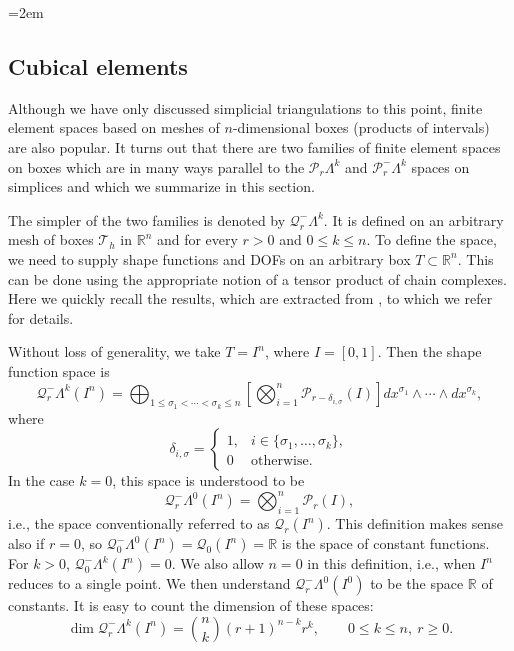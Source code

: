 \begingroup\emergencystretch=2em
\subsection{{Cubical elements}}\label{sec:cubical-elements}

{Although we have only discussed simplicial triangulations to this point, finite element spaces based on meshes of $n$-dimensional boxes (products of intervals) are also popular. It turns out that there are two families of finite element spaces on boxes which are in many ways parallel to the $\mathcal P_r\Lambda^k$ and $\mathcal P_r^-\Lambda^k$ spaces on simplices and which we summarize in this section.}

{The simpler of the two families is denoted by $\mathcal Q_r^-\Lambda^k$. It is defined on an arbitrary mesh of boxes $\mathcal T_h$ in $\mathbb R^n$ and for every $r>0$ and $0\leq k\leq n$. To define the space, we need to supply shape functions and DOFs on an arbitrary box $T\subset\mathbb R^n$. This can be done using the appropriate notion of a tensor product of chain complexes. Here we quickly recall the results, which are extracted from , to which we refer for details.}

{Without loss of generality, we take $T=I^n$, where $I=[0,1]$. Then the shape function space is}
\[
\mathcal Q_r^-\Lambda^k(I^n)=\bigoplus_{1\leq\sigma_1<\cdots<\sigma_k\leq n}\left[\bigotimes_{i=1}^n\mathcal P_{r-\delta_{i,\sigma}}(I)\right]dx^{\sigma_1}\wedge\cdots\wedge dx^{\sigma_k},
\]
{where}
\[
\delta_{i,\sigma}=\begin{cases}1,&i\in\{\sigma_1,\ldots,\sigma_k\},\\0&\text{otherwise}.\end{cases}
\]
{In the case $k=0$, this space is understood to be}
\[
\mathcal Q_r^-\Lambda^0(I^n)=\bigotimes_{i=1}^n\mathcal P_r(I),
\]
{i.e., the space conventionally referred to as $\mathcal Q_r(I^n)$. This definition makes sense also if $r=0$, so $\mathcal Q_0^-\Lambda^0(I^n)=\mathcal Q_0(I^n)=\mathbb R$ is the space of constant functions. For $k>0$, $\mathcal Q_0^-\Lambda^k(I^n)=0$. We also allow $n=0$ in this definition, i.e., when $I^n$ reduces to a single point. We then understand $\mathcal Q_r^-\Lambda^0(I^0)$ to be the space $\mathbb R$ of constants. It is easy to count the dimension of these spaces:}
\[
\dim\mathcal Q_r^-\Lambda^k(I^n)=\binom nk(r+1)^{n-k}r^k,\qquad0\leq k\leq n,\ r\geq0.
\]

